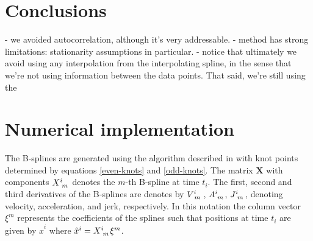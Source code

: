 \documentclass[10pt,journal]{IEEEtran}
\begin{document}


\section{Conclusions}

- we avoided autocorrelation, although it's very addressable.
- method has strong limitations: stationarity assumptions in particular.
- notice that ultimately we avoid using any interpolation from the interpolating spline, in the sense that we're not using information between the data points. That said, we're still using the 

%
\appendices
%

\section{Numerical implementation}
\label{sec:numerical_implementation}

The B-splines are generated using the algorithm described in \cite{deboor1978-book} with knot points determined by equations \ref{even-knots} and \ref{odd-knots}. The matrix $\mathbf{X}$ with components $X\indices{^i_m}$ denotes the $m$-th B-spline at time $t_i$. The first, second and third derivatives of the B-splines are denotes by $V\indices{^i_m}$, $A\indices{^i_m}$, $J\indices{^i_m}$, denoting velocity, acceleration, and jerk, respectively. In this notation the column vector $\xi^m$ represents the coefficients of the splines such that positions at time $t_i$ are given by $\hat{x}^i$ where $\hat{x}^i =  X\indices{^i_m} \xi^m$.
\end{document}
